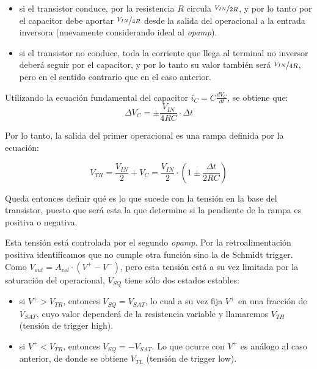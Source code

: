 \documentclass[../../tc_tp6_main.tex]{subfiles}
\begin{document}
\begin{itemize}
	\item si el transistor conduce, por la resistencia $R$ circula $\nicefrac{V_{IN}}{2R}$, y por lo tanto por el capacitor debe aportar $\nicefrac{V_{IN}}{4R}$ desde la salida del operacional a la entrada inversora (nuevamente considerando ideal al \textit{opamp}).
	\item si el transistor no conduce, toda la corriente que llega al terminal no inversor deber\'a seguir por el capacitor, y por lo tanto su valor tambi\'en ser\'a $\nicefrac{V_{IN}}{4R}$, pero en el sentido contrario que en el caso anterior.
\end{itemize}

Utilizando la ecuaci\'on fundamental del capacitor $i_C = C \frac{dV_C}{dt}$, se obtiene que:
\begin{equation}
	\Delta V_C = \pm \frac{V_{IN}}{4RC}\cdot\Delta t
	\label{eq:vc}
\end{equation}

Por lo tanto, la salida del primer operacional es una rampa definida por la ecuaci\'on:

\begin{equation}
	V_{TR} = \frac{V_{IN}}{2} + V_C = \frac{V_{IN}}{2} \cdot (1 \pm \frac{\Delta t}{2RC})
	\label{eq:vtr}	
\end{equation}

Queda entonces definir qu\'e es lo que sucede con la tensi\'on en la base del transistor, puesto que ser\'a esta la que determine si la pendiente de la rampa es positiva o negativa. \par

Esta tensi\'on est\'a controlada por el segundo \textit{opamp}. Por la retroalimentaci\'on positiva identificamos que no cumple otra funci\'on sino la de Schmidt trigger. Como $V_{out} = A_{vol} \cdot (V^+ - V^-)$, pero esta tensi\'on est\'a a su vez limitada por la saturaci\'on del operacional, $V_{SQ}$ tiene s\'olo dos estados estables:

\begin{itemize}
	\item si $V^+ > V_{TR}$, entonces $V_{SQ} = V_{SAT}$, lo cual a su vez fija $V^+$ en una fracci\'on de $V_{SAT}$, cuyo valor depender\'a de la resistencia variable y llamaremos $V_{TH}$ (tensi\'on de trigger high).
	\item si $V^+ < V_{TR}$, entonces $V_{SQ} = -V_{SAT}$. Lo que ocurre con $V^+$ es an\'alogo al caso anterior, de donde se obtiene $V_{TL}$ (tensi\'on de trigger low).
\end{itemize}
\end{document}
